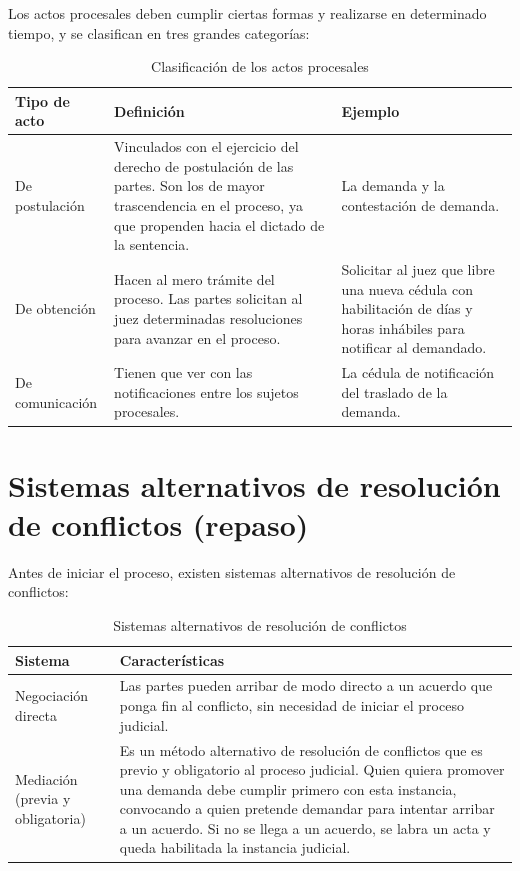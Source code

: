 \documentclass[12pt,oneside]{book}
\begin{document}
Los actos procesales deben cumplir ciertas formas y realizarse en determinado tiempo, y se clasifican en tres grandes categorías:

\begin{table}[H]
\centering
\caption{Clasificación de los actos procesales}
\begin{tabularx}{\textwidth}{l X X}
\toprule
\textbf{Tipo de acto} & \textbf{Definición} & \textbf{Ejemplo} \\
\midrule
De postulación & Vinculados con el ejercicio del derecho de postulación de las partes. Son los de mayor trascendencia en el proceso, ya que propenden hacia el dictado de la sentencia. & La demanda y la contestación de demanda. \\
De obtención & Hacen al mero trámite del proceso. Las partes solicitan al juez determinadas resoluciones para avanzar en el proceso. & Solicitar al juez que libre una nueva cédula con habilitación de días y horas inhábiles para notificar al demandado. \\
De comunicación & Tienen que ver con las notificaciones entre los sujetos procesales. & La cédula de notificación del traslado de la demanda. \\
\bottomrule
\end{tabularx}
\end{table}

\section{Sistemas alternativos de resolución de conflictos (repaso)}

Antes de iniciar el proceso, existen sistemas alternativos de resolución de conflictos:

\begin{table}[H]
\centering
\caption{Sistemas alternativos de resolución de conflictos}
\begin{tabularx}{\textwidth}{l X}
\toprule
\textbf{Sistema} & \textbf{Características} \\
\midrule
Negociación directa & Las partes pueden arribar de modo directo a un acuerdo que ponga fin al conflicto, sin necesidad de iniciar el proceso judicial. \\
Mediación (previa y obligatoria) & Es un método alternativo de resolución de conflictos que es previo y obligatorio al proceso judicial. Quien quiera promover una demanda debe cumplir primero con esta instancia, convocando a quien pretende demandar para intentar arribar a un acuerdo. Si no se llega a un acuerdo, se labra un acta y queda habilitada la instancia judicial. \\
\bottomrule
\end{tabularx}
\end{table}
\end{document}
